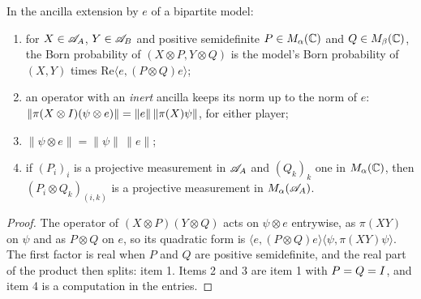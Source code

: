\begin{lemma}
\label{lem:ancilla-extension}
\leanok
In the ancilla extension by $e$ of a bipartite model:
\begin{enumerate}
  \item for $X \in \mathscr{A}_A$, $Y \in \mathscr{A}_B$ and positive semidefinite $P \in M_\alpha(\mathbb{C})$ and
    $Q \in M_\beta(\mathbb{C})$, the Born probability of $(X \otimes P, Y \otimes Q)$ is the model's Born
    probability of $(X, Y)$ times $\mathrm{Re}\langle e, (P \otimes Q) e\rangle$;
  \item an operator with an \emph{inert} ancilla keeps its norm up to the norm of $e$:
    $\|\pi(X \otimes I)(\psi \otimes e)\| = \|e\|\,\|\pi(X)\psi\|$, for either player;
  \item $\|\psi \otimes e\| = \|\psi\|\,\|e\|$;
  \item if $(P_i)_i$ is a projective measurement in $\mathscr{A}_A$ and $(Q_k)_k$ one in
    $M_\alpha(\mathbb{C})$, then $(P_i \otimes Q_k)_{(i,k)}$ is a projective measurement in
    $M_\alpha(\mathscr{A}_A)$.
\end{enumerate}
\end{lemma}

\begin{proof}
\leanok
The operator of $(X \otimes P)(Y \otimes Q)$ acts on $\psi \otimes e$ entrywise, as
$\pi(XY)$ on $\psi$ and as $P \otimes Q$ on $e$, so its quadratic form is
$\langle e, (P \otimes Q) e\rangle \langle \psi, \pi(XY) \psi\rangle$. The first factor is real
when $P$ and $Q$ are positive semidefinite, and the real part of the product then splits: item 1.
Items 2 and 3 are item 1 with $P = Q = I$, and item 4 is a computation in the entries.
\end{proof}

